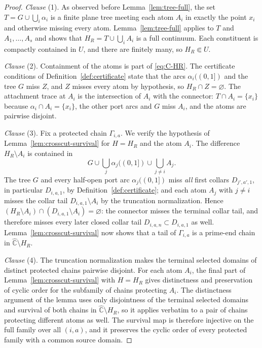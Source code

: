 \documentclass[11pt,reqno]{amsart}
\theoremstyle{definition}
\theoremstyle{remark}
\newcommand{\Chat}{\widehat{\mathbb C}}
\begin{document}
\begin{proof}
\emph{Clause} (1).  As observed before Lemma~\ref{lem:tree-full}, the set
$T=G\cup\bigcup_i\alpha_i$ is a finite plane tree meeting each atom $A_i$
in exactly the point $x_i$ and otherwise missing every atom.
Lemma~\ref{lem:tree-full} applies to $T$ and $A_1,\dots,A_s$ and shows
that $H_R=T\cup\bigcup_iA_i$ is a full continuum.  Each constituent is
compactly contained in $U$, and there are finitely many, so
$H_R\Subset U$.

\emph{Clause} (2).  Containment of the atoms is part of
\eqref{eq:C-HR}.  The certificate conditions of
Definition~\ref{def:certificate} state that the arcs
$\alpha_i((0,1])$ and the tree $G$ miss $Z$, and $Z$ misses every atom by
hypothesis, so $H_R\cap Z=\varnothing$.  The attachment trace at $A_i$ is
the intersection of $A_i$ with the connector: $T\cap A_i=\{x_i\}$ because
$\alpha_i\cap A_i=\{x_i\}$, the other port arcs and $G$ miss $A_i$, and
the atoms are pairwise disjoint.

\emph{Clause} (3).  Fix a protected chain $\Gamma_{i,a}$.  We verify the
hypothesis of Lemma~\ref{lem:crosscut-survival} for $H=H_R$ and the atom
$A_i$.  The difference $H_R\setminus A_i$ is contained in
\[
G\cup\bigcup_j\alpha_j((0,1])\cup\bigcup_{j\ne i}A_j .
\]
The tree $G$ and every half-open port arc $\alpha_j((0,1])$ miss
\emph{all} first collars $D_{j',a',1}$, in particular $D_{i,a,1}$, by
Definition~\ref{def:certificate}; and each atom $A_j$ with $j\ne i$
misses the collar tail $D_{i,a,1}\setminus A_i$ by the truncation
normalization.  Hence
$(H_R\setminus A_i)\cap(D_{i,a,1}\setminus A_i)=\varnothing$: the
connector misses the terminal collar tail, and therefore misses every
later closed collar tail $D_{i,a,n}\subset D_{i,a,1}$ as well.
Lemma~\ref{lem:crosscut-survival} now shows that a tail of
$\Gamma_{i,a}$ is a prime-end chain in $\Chat\setminus H_R$.

\emph{Clause} (4).  The truncation normalization makes the terminal
selected domains of distinct protected chains pairwise disjoint.  For
each atom $A_i$, the final part of Lemma~\ref{lem:crosscut-survival}
with $H=H_R$ gives distinctness and preservation of cyclic order for the
subfamily of chains protecting $A_i$.  The distinctness argument of the
lemma uses only disjointness of the terminal selected domains and
survival of both chains in $\Chat\setminus H_R$, so it applies verbatim
to a pair of chains protecting different atoms as well.  The survival
map is therefore injective on the full family over all $(i,a)$, and it
preserves the cyclic order of every protected family with a common
source domain.


\end{proof}
\end{document}
